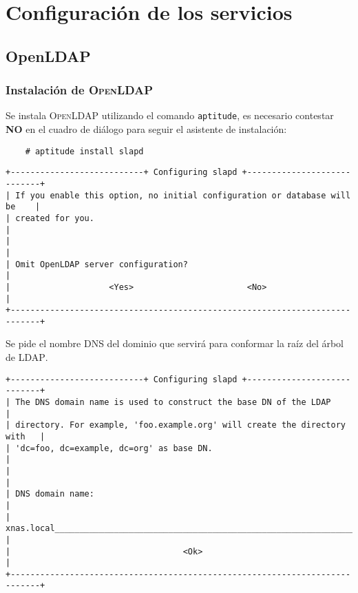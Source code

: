     \section {Configuraci\'{o}n de los servicios}

      \subsection {OpenLDAP}

          \subsubsection {Instalaci\'{o}n de \textsc{OpenLDAP}}

Se instala \textsc{OpenLDAP} utilizando el comando \texttt{aptitude}, es necesario contestar \textbf{NO} en el cuadro de di\'{a}logo para seguir el asistente de instalaci\'{o}n:

{
\scriptsize
\linespread{1}
\begin{verbatim}
    # aptitude install slapd
\end{verbatim}
}


{
\scriptsize
\linespread{1}
\begin{verbatim}
+---------------------------+ Configuring slapd +----------------------------+
| If you enable this option, no initial configuration or database will be    |
| created for you.                                                           |
|                                                                            |
| Omit OpenLDAP server configuration?                                        |
|                    <Yes>                       <No>                        |
+----------------------------------------------------------------------------+
\end{verbatim}
}

Se pide el nombre DNS del dominio que servir\'{a} para conformar la ra\'{i}z del \'{a}rbol de \textsc{LDAP}.

{
\scriptsize
\linespread{1}
\begin{verbatim}
+---------------------------+ Configuring slapd +----------------------------+
| The DNS domain name is used to construct the base DN of the LDAP           |
| directory. For example, 'foo.example.org' will create the directory with   |
| 'dc=foo, dc=example, dc=org' as base DN.                                   |
|                                                                            |
| DNS domain name:                                                           |
| xnas.local________________________________________________________________ |
|                                   <Ok>                                     |
+----------------------------------------------------------------------------+
\end{verbatim}
}

